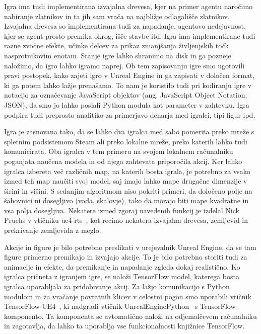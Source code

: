 \documentclass[a4paper, 12pt]{book}
\begin{document}
{Igra ima tudi implementirana izvajalna drevesa, kjer na primer agentu naročimo nabiranje zlatnikov in ta jih sam vrača na najbližje odlagališče zlatnikov.
Izvajalna drevesa so implementirana tudi za napadanje, agentovo nedejavnost, kjer se agent prosto premika okrog, išče stavbe itd.
Igra ima implementirane tudi razne zvočne efekte, učinke delcev za prikaz zmanjšanja življenjskih točk nasprotnikovim enotam.
Stanje igre lahko shranimo na disk in ga pozneje naložimo, da igro lahko igramo naprej.
Ob tem zapisovanju igre smo ugotovili pravi postopek, kako zajeti igro v Unreal Engine in ga zapisati v določen format, ki ga potem lahko lažje prenašamo.
To nam je koristilo tudi pri kodiranju igre v notacijo za označevanje JavaScript objektov (ang. JavaScript Object Notation; JSON), da smo jo lahko poslali Python modula kot parameter v zahtevku.
Igra podpira tudi preprosto analitiko za primerjavo denarja med igralci, tipi figur ipd.

Igra je zasnovana tako, da se lahko dva igralca med sabo pomerita preko mreže s spletnim podsistemom Steam ali preko lokalne mreže, preko katerih lahko tudi komunicirata.
Oba igralca v tem primeru na svojem lokalnem računalniku poganjata naučena modela in od njega zahtevata priporočila akcij.
Ker lahko igralca izbereta več različnih map, na katerih bosta igrala, je potrebno za vsako izmed teh map naučiti svoj model, saj imajo lahko mape drugačne dimenzije v širini in višini.
S sedanjim algoritmom niso pokriti primeri, da določeno polje na šahovnici ni dosegljivo (voda, skalovje), tako da morajo biti mape kvadratne in vsa polja dosegljiva.
Nekatere izmed zgoraj navedenih funkcij je izdelal Nick Pruehs v vtičniku ue4-rts~\cite{rtsUe4}, kot recimo nekatera izvajalna drevesa, zemljevid in prekrivanje zemljevida z meglo.

Akcije in figure je bilo potrebno preslikati v urejevalnik Unreal Engine, da se tam figure primerno premikajo in izvajajo akcije.
To je bilo potrebno storiti tudi za animacije in efekte, da premikanje in napadanje zgleda dokaj realistično.
Ko igralca pričneta z igranjem igre, se naloži TensorFlow model, katerega bosta igralca uporabljala za pridobivanje akcij.
Za lažjo komunikacijo s Python modulom in za vračanje povratnih klicev v celostni pogon smo uporabili vtičnik TensorFlow-UE4~\cite{ue4tf}, ki nadgradi vtičnik UnrealEnginePython~\cite{ue4python} s TensorFlow komponento. 
Ta komponenta se avtomatično naloži na odjemalčevem računalniku in zagotavlja, da lahko ta uporablja vse funkcionalnosti knjižnice TensorFlow.
 
}
\end{document}
